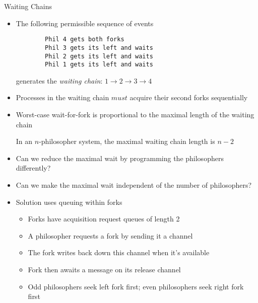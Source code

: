 \documentclass{concdistfoils}
\def\heading#1{\begin{cframed}[8.8in]{#1}\end{cframed}}
\begin{document}
\begin{slide}
\heading{Waiting Chains}
\vfill
\begin{itemize}
\item The following permissible sequence of events
\begin{verbatim}
        Phil 4 gets both forks
        Phil 3 gets its left and waits
        Phil 2 gets its left and waits
        Phil 1 gets its left and waits
\end{verbatim}

generates the \textit{waiting chain}: 
    $1\rightarrow 2 \rightarrow 3\rightarrow 4$
    
\item Processes in the waiting chain $must$ acquire their second forks sequentially
\item Worst-case wait-for-fork is proportional to the maximal length of the waiting chain
\begin{note}
In an $n$-philosopher system, the maximal waiting chain length is $n-2$
\end{note}
\item Can we reduce the maximal wait by programming the philosophers differently?
\item Can we make the maximal wait independent of the number of philosophers?
\end{itemize}
\end{slide}

\begin{slide}
\begin{itemize}
\item Solution uses queuing within forks
\begin{itemize}
\item Forks have acquisition request queues of length 2
\item A philosopher requests a fork by sending it a channel 
\item The fork writes back down this channel when it's available
\item Fork then awaits a message on its release channel
\item Odd philosophers seek left fork first; even philosophers seek right fork first
\end{itemize}
\end{itemize}
\end{slide}
\end{document}
